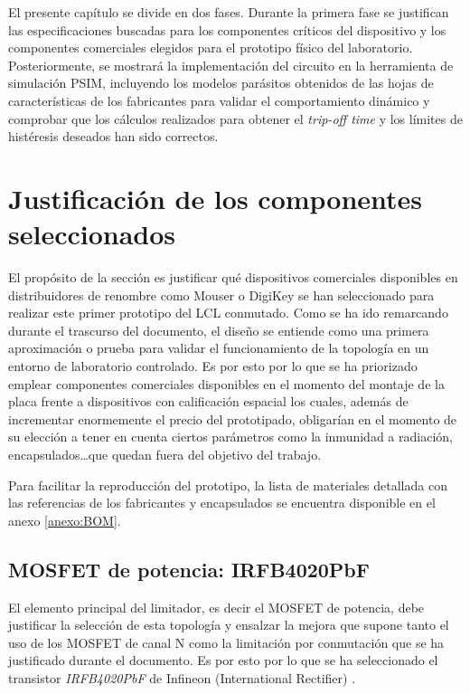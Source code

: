 \documentclass[12pt]{report} %
\begin{document}
El presente capítulo se divide en dos fases. Durante la primera fase se justifican las especificaciones buscadas para los componentes críticos del dispositivo y los componentes comerciales elegidos para el prototipo físico del laboratorio. Posteriormente, se mostrará la implementación del circuito en la herramienta de simulación PSIM, incluyendo los modelos parásitos obtenidos de las hojas de características de los fabricantes para validar el comportamiento dinámico y comprobar que los cálculos realizados para obtener el \textit{trip-off time} y los límites de histéresis deseados han sido correctos. 

\section{Justificación de los componentes seleccionados}
El propósito de la sección es justificar qué dispositivos comerciales disponibles en distribuidores de renombre como Mouser o DigiKey se han seleccionado para realizar este primer prototipo del LCL conmutado. Como se ha ido remarcando durante el trascurso del documento, el diseño se entiende como una primera aproximación o prueba para validar el funcionamiento de la topología en un entorno de laboratorio controlado. Es por esto por lo que se ha priorizado emplear componentes comerciales disponibles en el momento del montaje de la placa frente a dispositivos con calificación espacial los cuales, además de incrementar enormemente el precio del prototipado, obligarían en el momento de su elección a tener en cuenta ciertos parámetros como la inmunidad a radiación, encapsulados\dots que quedan fuera del objetivo del trabajo. 

Para facilitar la reproducción del prototipo, la lista de materiales detallada con las referencias de los fabricantes y encapsulados se encuentra disponible en el anexo \ref{anexo:BOM}.
\subsection{MOSFET de potencia: IRFB4020PbF}
El elemento principal del limitador, es decir el MOSFET de potencia, debe justificar la selección de esta topología y ensalzar la mejora que supone tanto el uso de los MOSFET de canal N como la limitación por conmutación que se ha justificado durante el documento. Es por esto por lo que se ha seleccionado el transistor \textit{IRFB4020PbF} de Infineon (International Rectifier) \cite{noauthor_irfb4020pbfpmd_nodate}.
\end{document}
